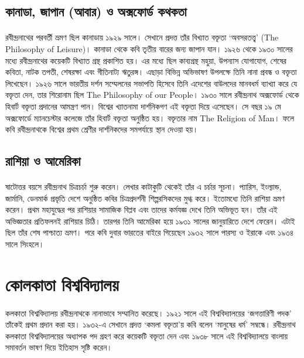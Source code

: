 \documentclass{article}
\begin{document}
\subsection{কানাডা, জাপান (আবার) ও অক্সফোর্ড কথকতা}
\paragraph{}
রবীন্দ্রনাথের পরবর্তী ভ্রমণ ছিল কানাডায় ১৯২৯ সালে। সেখানে প্রদত্ত তাঁর বিখ্যাত বক্তৃতা ‘অবসরতত্ত্ব’ (The Philosophy of Leisure)। কানাডা থেকে কবি তৃতীয় বারের জন্য জাপান যান। ১৯২৬ থেকে ১৯৩০ সালের মধ্যে রবীন্দ্রনাথের কয়েকটি বিখ্যাত গ্রন্থ প্রকাশিত হয়। এর মধ্যে ছিল কাব্যগ্রন্থ মহুয়া, উপন্যাস যোগাযোগ, শেষের কবিতা, নাটক তপতী, শেষরক্ষা এবং গীতিনাট্য ঋতুরঙ্গ। এছাড়া বিভিন্ন অভিভাষণ উপলক্ষে তিনি নানা প্রবন্ধ ও বক্তৃতা লিখেছেন। ১৯২৬ সালে ভারতীয় দর্শন সম্মেলনের সভাপতি হিসেবে তিনি এদেশের বাউলদের মানবধর্ম ব্যাখ্যা করে যে বক্তৃতা দেন, তার শিরোনাম ছিল The Philosophy of our People। ১৯৩০ সালে রবীন্দ্রনাথ অক্সফোর্ড থেকে হিবার্ট বক্তৃতা প্রদানের আমন্ত্রণ পান। বিশ্বের খ্যাতনামা দার্শনিকগণ এই বক্তৃতা দিয়ে এসেছেন। সে বছর ১৯ মে অক্সফোর্ডে ম্যানচেস্টার কলেজে তাঁর হিবার্ট বক্তৃতা অনুষ্ঠিত হয়। বক্তৃতার নাম The Religion of Man। ফলে কবি রবীন্দ্রনাথকে বিশ্বের প্রথম শ্রেণীর দার্শনিকদের সমপর্যায়ে স্থান দেওয়া হয়।
\subsection{রাশিয়া ও আমেরিকা}
\paragraph{}
ষাটোত্তর বয়সে রবীন্দ্রনাথ চিত্রচর্চা শুরু করেন। লেখার কাটাকুটি থেকেই তাঁর এ চর্চার সূচনা। প্যারিস, ইংল্যান্ড, জার্মানি, ডেনমার্ক প্রভৃতি দেশে অনুষ্ঠিত কবির চিত্রপ্রদর্শনী শিল্পরসিকদের মুগ্ধ করে। ইতোমধ্যে তিনি রাশিয়া ভ্রমণ করেন। প্রথম মহাযুদ্ধের পর রাশিয়ার সামাজিক বিপ্লব এবং তাদের কর্মযজ্ঞ দেখে তিনি অভিভূত হন। তাঁর এই অভিজ্ঞতার প্রতিফলনই রাশিয়ার চিঠি। তারপর তিনি আমেরিকা হয়ে ১৯৩১ সালের জানুয়ারিতে দেশে ফেরেন। এটাই ছিল তাঁর শেষ পাশ্চাত্য ভ্রমণ। পরে কবি দুবার ভারতের বাইরে গিয়েছেন ১৯৩২ সালে পারস্য ও ইরাকে এবং ১৯৩৪ সালে সিংহলে।

\section{কোলকাতা বিশ্ববিদ্যালয়}
\paragraph{}
কলকাতা বিশ্ববিদ্যালয় রবীন্দ্রনাথকে নানাভাবে সম্মানিত করেছে। ১৯২১ সালে এই বিশ্ববিদ্যালয়ের ‘জগত্তারিণী পদক’ তাঁকেই প্রথম প্রদান করা হয়। ১৯৩২-এ সেখানে প্রদত্ত ‘কমলা বক্তৃতা’য় কবি বলেন ‘মানুষের ধর্ম’ সম্বন্ধে। রবীন্দ্রনাথ কলকাতা বিশ্ববিদ্যালয়ের অধ্যাপক পদ গ্রহণ করে কয়েকটি বক্তৃতা দেন এবং ১৯৩৮ সালে এই বিশ্ববিদ্যালয়ে বাংলায় সমাবর্তন ভাষণ দিয়ে ইতিহাস সৃষ্টি করেন।
\end{document}
